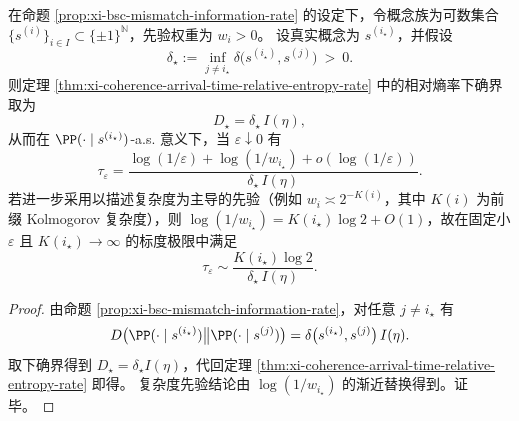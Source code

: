 \begin{corollary}\label{cor:xi-holographic-coherence-time-godel-penalty}
在命题 \ref{prop:xi-bsc-mismatch-information-rate} 的设定下，令概念族为可数集合 \(\{s^{(i)}\}_{i\in I}\subset\{\pm1\}^{\mathbb N}\)，先验权重为 \(w_i>0\)。
设真实概念为 \(s^{(i_\star)}\)，并假设
\[
\delta_\star:=\inf_{j\neq i_\star}\delta\bigl(s^{(i_\star)},s^{(j)}\bigr)\ >\ 0.
\]
则定理 \ref{thm:xi-coherence-arrival-time-relative-entropy-rate} 中的相对熵率下确界取为
\[
D_\star=\delta_\star\,I(\eta),
\]
从而在 \(\PP(\cdot\mid s^{(i_\star)})\)-a.s. 意义下，当 \(\varepsilon\downarrow 0\) 有
\[
\tau_\varepsilon
=\frac{\log(1/\varepsilon)+\log(1/w_{i_\star})+o(\log(1/\varepsilon))}{\delta_\star\,I(\eta)}.
\]
若进一步采用以描述复杂度为主导的先验（例如 \(w_i\asymp 2^{-K(i)}\)，其中 \(K(i)\) 为前缀 Kolmogorov 复杂度），则 \(\log(1/w_{i_\star})=K(i_\star)\log 2+O(1)\)，故在固定小 \(\varepsilon\) 且 \(K(i_\star)\to\infty\) 的标度极限中满足
\[
\tau_\varepsilon\sim \frac{K(i_\star)\log 2}{\delta_\star\,I(\eta)}.
\]
\end{corollary}

\begin{proof}
由命题 \ref{prop:xi-bsc-mismatch-information-rate}，对任意 \(j\neq i_\star\) 有
\[
D\bigl(\PP(\cdot\mid s^{(i_\star)})\big\|\PP(\cdot\mid s^{(j)})\bigr)
=\delta\bigl(s^{(i_\star)},s^{(j)}\bigr)\,I(\eta).
\]
取下确界得到 \(D_\star=\delta_\star I(\eta)\)，代回定理 \ref{thm:xi-coherence-arrival-time-relative-entropy-rate} 即得。
复杂度先验结论由 \(\log(1/w_{i_\star})\) 的渐近替换得到。证毕。
\end{proof}



